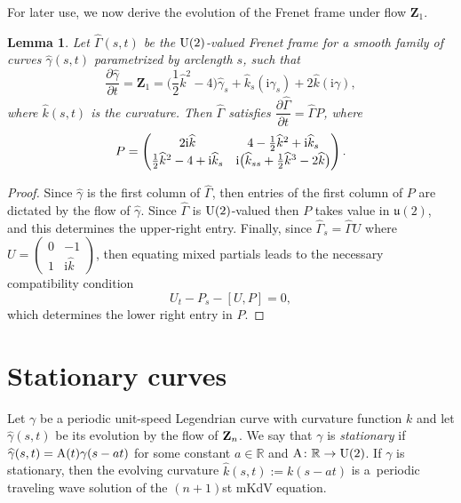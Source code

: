 \documentclass[10pt,a4paper]{amsart}
\newcommand\kk{k} %
\def\ri{\mathrm{i}}
\newcommand\VZ{\mathbf Z}
\def\gam{\gamma} %
\def\di{\partial}
\def\R{\mathbb R}
\newcommand\gamf{\widehat{\gam}} %
\newcommand\Gamf{\widehat{\Gamma}} %
\newcommand\kh{\widehat{\kk}} %
\numberwithin{equation}{section}
\newtheorem{Lemma}[Theorem]{Lemma}
\begin{document}
For later use, we now derive the evolution of the Frenet frame under flow $\VZ_1$.

\begin{Lemma}\label{FrenetEvolution} Let $\Gamf(s,t)$ be the ${\rm U}(2)$-valued Frenet frame for a smooth family of curves $\gamf(s,t)$ parametrized
by arclength $s$, such that
\[\dfrac{\di \gamf}{\di t} = \VZ_1 = \biggl(\frac12 \kh^2 -4\biggr) \gamf_s + \kh_s (\ri \gam_s) + 2\kh (\ri \gam),\]
where $\kh(s,t)$ is the curvature. Then $\Gamf$ satisfies $\dfrac{\di \Gamf}{\di t} = \Gamf P$, where
\begin{equation}\label{Z1flowPform}\renewcommand{\arraystretch}{1.2}
P = \begin{pmatrix} 2\ri \kh & 4 - \tfrac12 \kh^2 +\ri \kh_s \\ \tfrac12 \kh^2 -4 + \ri \kh_s & \ri \bigl(\kh_{ss} + \tfrac12\kh^3 -2\kh\bigr) \end{pmatrix}.
\end{equation}
\end{Lemma}
\begin{proof} Since $\gamf$ is the first column of $\Gamf$, then entries of the first column of $P$ are dictated by the flow of $\gamf$.
Since $\Gamf$ is ${\rm U}(2)$-valued then $P$ takes value in ${\mathfrak u}(2)$, and this determines the upper-right entry. Finally,
since $\Gamf_s = \Gamf U$ where $U=\left( \begin{smallmatrix} 0 & -1 \\ 1 & \ri\kh \end{smallmatrix} \right)$, then equating mixed partials leads to the necessary compatibility condition
\[U_t - P_s - [U,P] = 0,\]
which determines the lower right entry in $P$.
\end{proof}


\section{Stationary curves}\label{sec4}
\def\ki{\kk}
\def\gami{\gam}
\def\kf{\kh}

Let $\gami$ be a periodic unit-speed Legendrian curve {with curvature function $\ki$} and let $\gamf(s,t)$ be its evolution by the flow of ${\bf Z}_n$.
We say that $\gami$ is {\it stationary} if $\gamf(s,t)={\rm A}(t)\gami(s-at)$ for some constant $a\in \R$ and ${\rm A}\colon \R\to {\rm U}(2)$.
If $\gami$ is stationary, then the evolving curvature $\kf(s,t):=\ki(s-at)$ is a~periodic traveling wave solution of the $(n+1)$st mKdV equation.
\end{document}
